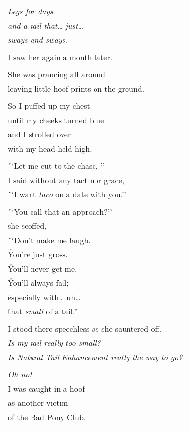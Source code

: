 \documentclass{article}
\begin{document}
\begin{center}
\begin{tabular}{l}
\end{tabular}
\begin{tabular}{l}
\\
\textit{Legs for days} \\
\textit{and a tail that\ldots{} just\ldots{}} \\
\textit{sways and sways.} \\
\\
I saw her again a month later. \\
\\
She was prancing all around \\
leaving little hoof prints on the ground. \\
\\
So I puffed up my chest \\
until my cheeks turned blue \\
and I strolled over \\
with my head held high. \\
\\
\h``Let me cut to the chase, '' \\
I said without any tact nor grace, \\
\h``I want \textit{taco} on a date with you.'' \\
\\
\h``You call that an approach?'' \\
she scoffed, \\
\h``Don't make me laugh. \\
\h You're just gross. \\
\h You'll never get me. \\
\h You'll always fail; \\
\h especially with\ldots{} uh\ldots{} \\
\h that \textit{small} of a tail.'' \\
\\
I stood there speechless as she sauntered off. \\
\textit{Is my tail really too small?} \\
\textit{Is Natural Tail Enhancement really the way to go?} \\
\\
\textit{Oh no!}
\\
I was caught in a hoof \\
as another victim \\
of the Bad Pony Club. \\
\\
\end{tabular}
\end{center}
\end{document}
